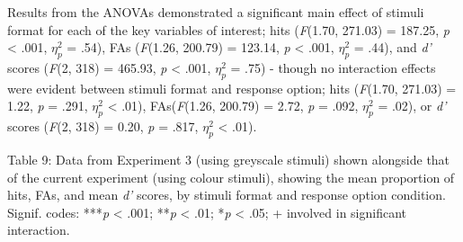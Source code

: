 \documentclass[
  11pt,
]{article}
\begin{document}
Results from the ANOVAs demonstrated a significant main effect of
stimuli format for each of the key variables of interest; hits
(\emph{F}(1.70, 271.03) = 187.25, \emph{p} \textless{} .001,
\(\eta^2_p\) = .54), FAs (\emph{F}(1.26, 200.79) = 123.14, \emph{p}
\textless{} .001, \(\eta^2_p\) = .44), and \emph{d'} scores (\emph{F}(2,
318) = 465.93, \emph{p} \textless{} .001, \(\eta^2_p\) = .75) - though
no interaction effects were evident between stimuli format and response
option; hits (\emph{F}(1.70, 271.03) = 1.22, \emph{p} = .291,
\(\eta^2_p\) \textless{} .01), FAs(\emph{F}(1.26, 200.79) = 2.72,
\emph{p} = .092, \(\eta^2_p\) = .02), or \emph{d'} scores (\emph{F}(2,
318) = 0.20, \emph{p} = .817, \(\eta^2_p\) \textless{} .01).

\newpage

Table 9: Data from Experiment 3 (using greyscale stimuli) shown
alongside that of the current experiment (using colour stimuli), showing
the mean proportion of hits, FAs, and mean \emph{d'} scores, by stimuli
format and response option condition. Signif. codes: ***\emph{p}
\textless{} .001; **\emph{p} \textless{} .01; *\emph{p} \textless{} .05;
+ involved in significant interaction.

\begin{table}[!h]
\centering\begingroup\fontsize{13}{15}\selectfont

\endgroup{}
\end{table}
\end{document}
